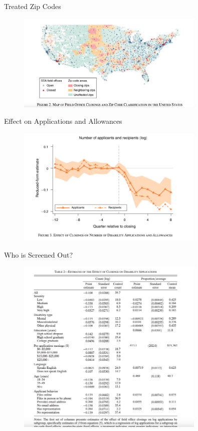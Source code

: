 \documentclass{beamer}
\begin{document}
\begin{frame}{Treated Zip Codes}
    \begin{figure}
        \centering
        \includegraphics[width=0.8\textwidth]{F2.png}
    \end{figure}
\end{frame}

\begin{frame}{Effect on Applications and Allowances}
    \begin{figure}
        \centering
        \includegraphics[width=0.8\textwidth]{F3.png}
    \end{figure}
\end{frame}

\begin{frame}{Who is Screened Out?}
    \begin{figure}
        \centering
        \includegraphics[width=0.8\textwidth]{T2.png}
    \end{figure}
\end{frame}
\end{document}
